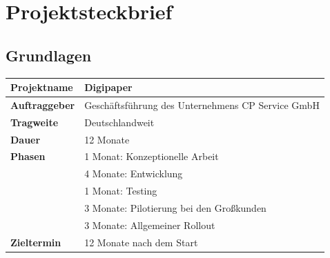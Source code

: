 \chapter{Projektsteckbrief}
\section{Grundlagen}
\label{chapter:1}

\begin{center}
	\begin{tabularx}{\textwidth}{|l|X|}
		\hline
		\textbf{Projektname} & Digipaper \\
		\hline
		\textbf{Auftraggeber} & Geschäftsführung des Unternehmens CP Service GmbH \\
		\hline
		\textbf{Tragweite} & Deutschlandweit \\
		\hline
		\textbf{Dauer} & 12 Monate \\
		\hline
		\textbf{Phasen} 
		& 1 Monat: Konzeptionelle Arbeit \\
		& 4 Monate: Entwicklung \\
		& 1 Monat: Testing \\
		& 3 Monate: Pilotierung bei den Großkunden \\
		& 3 Monate: Allgemeiner Rollout \\
		\hline
		\textbf{Zieltermin} & 12 Monate nach dem Start \\
		\hline
	\end{tabularx}
\end{center}
 \label{tab:kopfdaten}\vspace{10pt}

